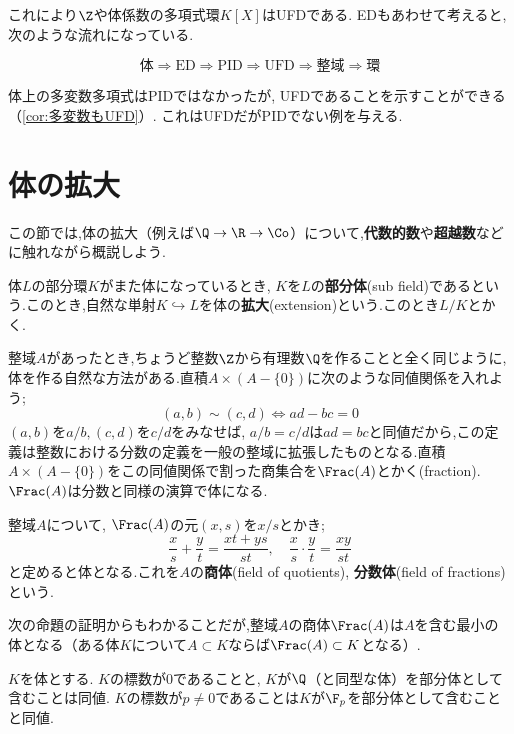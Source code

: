 これにより$\Z$や体係数の多項式環$K[X]$はUFDである. EDもあわせて考えると,次のような流れになっている.

\[\text{体}\Longrightarrow\text{ED}\Longrightarrow\text{PID}\Longrightarrow\text{UFD}\Longrightarrow\text{整域}\Longrightarrow\text{環}\]

体上の多変数多項式はPIDではなかったが, UFDであることを示すことができる（\ref{cor:多変数もUFD}）. これはUFDだがPIDでない例を与える.

\section{体の拡大}

この節では,体の拡大（例えば$\Q\to\R\to\Co$）について,\textbf{代数的数}や\textbf{超越数}などに触れながら概説しよう.

体$L$の部分環$K$がまた体になっているとき, $K$を$L$の\textbf{部分体}(sub field)であるという.このとき,自然な単射$K\hookrightarrow L$を体の\textbf{拡大}(extension)という.このとき$L/K$とかく.

整域$A$があったとき,ちょうど整数$\Z$から有理数$\Q$を作ることと全く同じように,体を作る自然な方法がある.直積$A\times(A-\{0\})$に次のような同値関係を入れよう;
\[(a,b)\sim(c,d)\Longleftrightarrow ad-bc=0\]
$(a,b)$を$a/b,(c,d)$を$c/d$をみなせば, $a/b=c/d$は$ad=bc$と同値だから,この定義は整数における分数の定義を一般の整域に拡張したものとなる.直積$A\times(A-\{0\})$をこの同値関係で割った商集合を$\Frac (A)$とかく(fraction). $\Frac (A)$は分数と同様の演算で体になる.

\begin{defi}[商体]
	整域$A$について, $\Frac (A)$の元$(x,s)$を$x/s$とかき;
	\[\frac{x}{s}+\frac{y}{t}=\frac{xt+ys}{st},\quad \frac{x}{s}\cdot\frac{y}{t}=\frac{xy}{st}\]
	と定めると体となる.これを$A$の\textbf{商体}(field of quotients), \textbf{分数体}(field of fractions)という.
\end{defi}

次の命題の証明からもわかることだが,整域$A$の商体$\Frac (A)$は$A$を含む最小の体となる（ある体$K$について$A\subset K$ならば$\Frac (A)\subset K$となる）.
\begin{prop}
	$K$を体とする. $K$の標数が0であることと, $K$が$\Q$（と同型な体）を部分体として含むことは同値. $K$の標数が$p\neq0$であることは$K$が$\F_p$を部分体として含むことと同値.
\end{prop}

